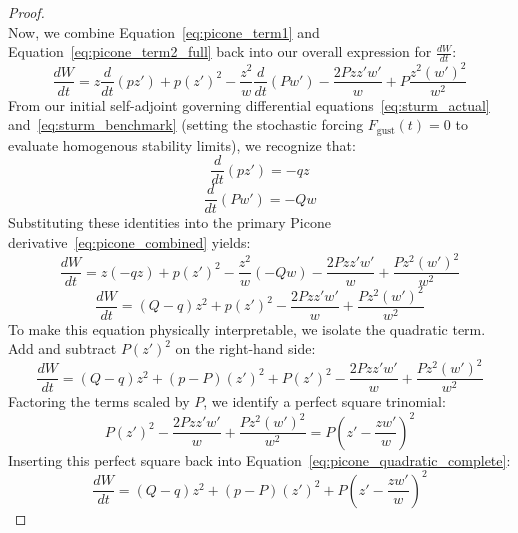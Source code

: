 \documentclass[11pt,a4paper]{book}
\begin{document}
\begin{proof}
\begin{equation}
\end{equation}
Now, we combine Equation~\eqref{eq:picone_term1} and Equation~\eqref{eq:picone_term2_full} back into our overall expression for $\frac{dW}{dt}$:
\begin{equation}
\label{eq:picone_combined}
\frac{dW}{dt} = z \frac{d}{dt}(p z') + p (z')^2 - \frac{z^2}{w} \frac{d}{dt}(P w') - \frac{2 P z z' w'}{w} + P \frac{z^2 (w')^2}{w^2}
\end{equation}
From our initial self-adjoint governing differential equations~\eqref{eq:sturm_actual} and~\eqref{eq:sturm_benchmark} (setting the stochastic forcing $F_{\text{gust}}(t)=0$ to evaluate homogenous stability limits), we recognize that:
\begin{equation}
\label{eq:sub_sturm1}
\frac{d}{dt}(p z') = -q z
\end{equation}
\begin{equation}
\label{eq:sub_sturm2}
\frac{d}{dt}(P w') = -Q w
\end{equation}
Substituting these identities into the primary Picone derivative~\eqref{eq:picone_combined} yields:
\begin{equation}
\label{eq:picone_substituted}
\frac{dW}{dt} = z (-q z) + p (z')^2 - \frac{z^2}{w} (-Q w) - \frac{2 P z z' w'}{w} + \frac{P z^2 (w')^2}{w^2}
\end{equation}
\begin{equation}
\label{eq:picone_simplified}
\frac{dW}{dt} = (Q - q) z^2 + p (z')^2 - \frac{2 P z z' w'}{w} + \frac{P z^2 (w')^2}{w^2}
\end{equation}
To make this equation physically interpretable, we isolate the quadratic term. Add and subtract $P (z')^2$ on the right-hand side:
\begin{equation}
\label{eq:picone_quadratic_complete}
\frac{dW}{dt} = (Q - q) z^2 + (p - P)(z')^2 + P (z')^2 - \frac{2 P z z' w'}{w} + \frac{P z^2 (w')^2}{w^2}
\end{equation}
Factoring the terms scaled by $P$, we identify a perfect square trinomial:
\begin{equation}
\label{eq:picone_perfect_square}
P (z')^2 - \frac{2 P z z' w'}{w} + \frac{P z^2 (w')^2}{w^2} = P \left( z' - \frac{z w'}{w} \right)^2
\end{equation}
Inserting this perfect square back into Equation~\eqref{eq:picone_quadratic_complete}:
\begin{equation}
\label{eq:picone_final_identity}
\frac{dW}{dt} = (Q - q) z^2 + (p - P)(z')^2 + P \left( z' - \frac{z w'}{w} \right)^2
\end{equation}

\end{proof}
\end{document}
